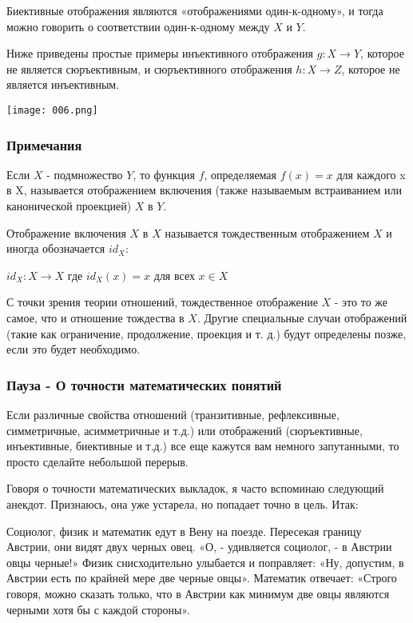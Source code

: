 Биективные отображения являются «отображениями один-к-одному», и тогда можно говорить о соответствии один-к-одному между \(X\) и \(Y\).

Ниже приведены простые примеры инъективного отображения \(g: X \rightarrow Y\), которое не является сюръективным, и сюръективного отображения \(h: X \rightarrow Z\), которое не является инъективным.
\begin{center}
  \texttt{[image: 006.png]}
\end{center}

\subsubsection{Примечания}
Если \(X\) - подмножество \(Y\), то функция \(f\), определяемая \(f(x) = x\) для каждого x в X, называется отображением включения (также называемым встраиванием или канонической проекцией) \(X\) в \(Y\).

Отображение включения \(X\) в \(X\) называется тождественным отображением \(X\) и иногда обозначается \(id_X\):

\vspace{0.5cm}
\(id_X:X \rightarrow X\) где \(id_X (x) = x\) для всех \(x \in X\)
\vspace{0.5cm}

С точки зрения теории отношений, тождественное отображение \(X\) - это то же самое, что и отношение тождества в \(X\). Другие специальные случаи отображений (такие как ограничение, продолжение, проекция и т. д.) будут определены позже, если это будет необходимо.

\subsubsection{Пауза - О точности математических понятий}
Если различные свойства отношений (транзитивные, рефлексивные, симметричные, асимметричные и т.д.) или отображений (сюръективные, инъективные, биективные и т.д.) все еще кажутся вам немного запутанными, то просто сделайте небольшой перерыв.

Говоря о точности математических выкладок, я часто вспоминаю следующий анекдот. Признаюсь, она уже устарела, но попадает точно в цель. Итак:

Социолог, физик и математик едут в Вену на поезде. Пересекая границу Австрии, они видят двух черных овец. «О, - удивляется социолог, - в Австрии овцы черные!» Физик снисходительно улыбается и поправляет: «Ну, допустим, в Австрии есть по крайней мере две черные овцы». Математик отвечает: «Строго говоря, можно сказать только, что в Австрии как минимум две овцы являются черными хотя бы с каждой стороны».

